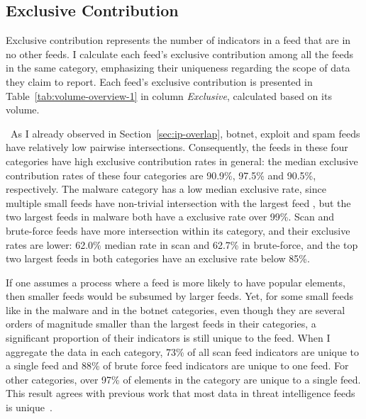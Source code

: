 \subsection{Exclusive Contribution}
\label{sec:ip-unique}

Exclusive contribution represents the number of indicators in a feed that are in no other feeds. I calculate each feed's exclusive contribution among all the feeds in the same category, emphasizing their uniqueness regarding the scope of data they claim to report. Each feed's exclusive contribution is presented in Table~\ref{tab:volume-overview-1} in column \emph{Exclusive}, calculated based on its volume.

\finding\ As I already observed in Section~\ref{sec:ip-overlap}, botnet, exploit and spam feeds have relatively low pairwise intersections. Consequently, the feeds in these four categories have high exclusive contribution rates in general: the median exclusive contribution rates of these four categories are 90.9\%, 97.5\% and 90.5\%, respectively. The malware category has a low median exclusive rate, since multiple small feeds have non-trivial intersection with the largest feed {\feedetiprep}, but the two largest feeds in malware both have a exclusive rate over 99\%. Scan and brute-force feeds have more intersection within its category, and their exclusive rates are lower: 62.0\% median rate in scan and 62.7\% in brute-force, and the top two largest feeds in both categories have an exclusive rate below 85\%.

If one assumes a process where a feed is more likely to have popular elements, then smaller feeds would be subsumed by larger feeds. Yet, for some small feeds like {\feedmalcode} in the malware and {\feedTSHoneypot} in the botnet categories, even though they are several orders of magnitude smaller than the largest feeds in their categories, a significant proportion of their indicators is still unique to the feed. When I aggregate the data in each category, 73\% of all scan feed indicators are unique to a single feed and 88\% of brute force feed indicators are unique to one feed. For other categories, over 97\% of elements in the category are unique to a single feed. This result agrees with previous work that most data in threat intelligence feeds is unique~\cite{metcalf2015blacklist,thomas2016abuse}.